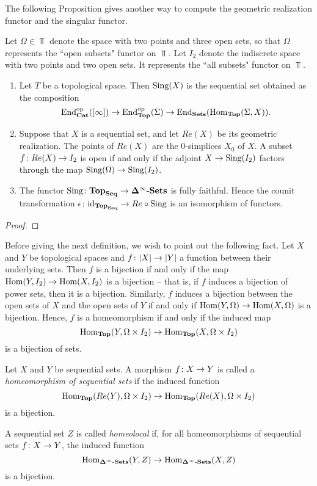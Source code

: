 \documentclass{amsart}
\def\Seq{{\bf Seq}}
\def\Del{{\bf \Delta}}
\def\dashSets{{\tn{-}\Sets}}
\def\Delinf{{\Del^\infty}}
\def\DSets{{\Delinf\dashSets}}
\def\Sing{\tn{Sing}}
\begin{document}
The following Proposition gives another way to compute the geometric realization functor and the singular functor.

Let $\Omega\in\Top$ denote the space with two points and three open sets, so that $\Omega$ represents the ``open subsets" functor on $\Top$.  Let $I_2$ denote the indiscrete space with two points and two open sets.  It represents the ``all subsets" functor on $\Top$.

\begin{proposition}\label{sing and re}

\begin{enumerate}\item Let $T$ be a topological space.  Then $\Sing(X)$ is the sequential set obtained as the composition $$\textnormal{End}^\textnormal{op}_{\bf Cat}([\infty])\rightarrow\textnormal{End}^\textnormal{op}_{\bf Top}(\Sigma)\rightarrow\textnormal{End}_{\bf Sets}(\textnormal{Hom}_{\bf Top}(\Sigma,X)).$$  \item Suppose that $X$ is a sequential set, and let $Re(X)$ be its geometric realization.  The points of $Re(X)$ are the 0-simplices $X_0$ of $X$.  A subset $f\colon Re(X)\rightarrow I_2$ is open if and only if the adjoint $X\to\Sing(I_2)$ factors through the map $\Sing(\Omega)\to\Sing(I_2)$.\item The functor $\Sing\taking\Top_\Seq\to\DSets$ is fully faithful.  Hence the counit transformation $\epsilon\taking\id_{\Top_\Seq}\to Re\circ\Sing$ is an isomorphism of functors.\end{enumerate}

\end{proposition}

\begin{proof}

\end{proof}

Before giving the next definition, we wish to point out the following fact.  Let $X$ and $Y$ be topological spaces and $f\colon |X|\rightarrow|Y|$ a function between their underlying sets.  Then $f$ is a bijection if and only if the map $\textnormal{Hom}(Y,I_2)\rightarrow\textnormal{Hom}(X,I_2)$ is a bijection -- that is, if $f$ induces a bijection of power sets, then it is a bijection.  Similarly, $f$ induces a bijection between the open sets of $X$ and the open sets of $Y$ if and only if $\textnormal{Hom}(Y,\Omega)\rightarrow\textnormal{Hom}(X,\Omega)$ is a bijection.  Hence, $f$ is a homeomorphism if and only if the induced map $$\textnormal{Hom}_{\bf Top}(Y,\Omega\times I_2)\rightarrow\textnormal{Hom}_{\bf Top}(X,\Omega\times I_2)$$ is a bijection of sets.

\begin{definition}

Let $X$ and $Y$ be sequential sets.  A morphism $f\colon X\rightarrow Y$ is called a {\em homeomorphism of sequential sets} if the induced function $$\textnormal{Hom}_{\bf Top}(Re(Y),\Omega\times I_2)\rightarrow\textnormal{Hom}_{\bf Top}(Re(X),\Omega\times I_2)$$ is a bijection.

A sequential set $Z$ is called {\em homeolocal} if, for all homeomorphisms of sequential sets $f\colon X\rightarrow Y$, the induced function $$\Hom_\DSets(Y,Z)\to\Hom_\DSets(X,Z)$$ is a bijection.

\end{definition}
\end{document}
